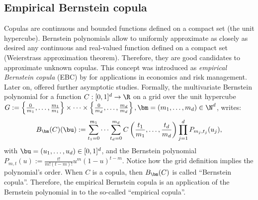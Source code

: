 \subsection{Empirical Bernstein copula}

Copulas are continuous and bounded functions defined on a compact set (the unit hypercube). 
Bernstein polynomials allow to uniformly approximate as closely as desired any continuous and real-valued function defined on a compact set (Weierstrass approximation theorem). 
Therefore, they are good candidates to approximate unknown copulas. 
This concept was introduced as \emph{empirical Bernstein copula} (EBC) by \cite{sancetta_satchell_2004} for applications in economics and risk management. 
Later on, \cite{segers_2017} offered further asymptotic studies. 
Formally, the multivariate Bernstein polynomial for a function $C: [0, 1]^d \rightarrow \R$ on a grid over the unit hypercube $G:=\left\{\frac{0}{m_1}, \dots, \frac{m_1}{m_1}\right\} \times \dots \times \left\{\frac{0}{m_d}, \dots, \frac{m_d}{m_d}\right\}, \bm = (m_1, \dots, m_d) \in \N^d$, writes: 
\begin{equation}
    B_{\bm}(C)(\bu) := \sum_{t_1=0}^{m_1} \dots \sum_{t_d=0}^{m_d} C\left(\frac{t_1}{m_1}, \dots, \frac{t_d}{m_d}\right) \prod_{j=1}^d P_{m_j, t_j}(u_j),\label{eq:ebc}
\end{equation}
with $\bu = (u_1, \dots, u_d) \in [0, 1]^d$, and the Bernstein polynomial $P_{m, t}(u):= \frac{t!}{m!(t-m)!}u^m(1-u)^{t-m}$. 
Notice how the grid definition implies the polynomial's order. 
When $C$ is a copula, then $B_{\bm}(C)$ is called ``Bernstein copula''. 
Therefore, the empirical Bernstein copula is an application of the Bernstein polynomial in  to the so-called ``empirical copula''.

